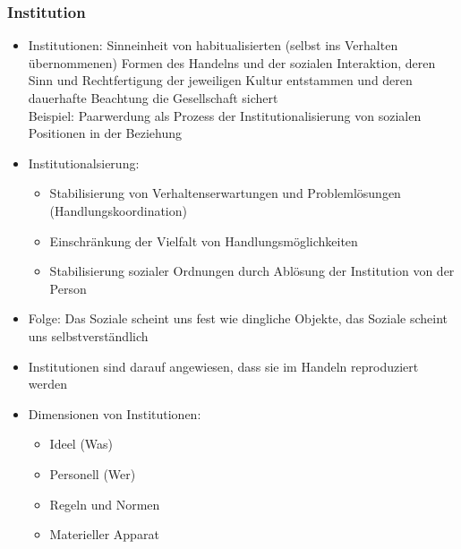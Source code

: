 \documentclass{scrartcl}
\begin{document}
\subsubsection*{Institution}
\begin{itemize}
    \item
        Institutionen: Sinneinheit von habitualisierten (selbst ins Verhalten übernommenen) Formen des Handelns und der sozialen Interaktion, deren Sinn und Rechtfertigung der jeweiligen Kultur entstammen und deren dauerhafte Beachtung die Gesellschaft sichert\\
        Beispiel: Paarwerdung als Prozess der Institutionalisierung von sozialen Positionen in der Beziehung
    \item
        Institutionalsierung:
        \begin{itemize}
            \item
                Stabilisierung von Verhaltenserwartungen und Problemlösungen (Handlungskoordination)
            \item
                Einschränkung der Vielfalt von Handlungsmöglichkeiten
            \item
                Stabilisierung sozialer Ordnungen durch Ablösung der Institution von der Person
        \end{itemize}
    \item
        Folge: Das Soziale scheint uns fest wie dingliche Objekte, das Soziale scheint uns selbstverständlich
    \item
        Institutionen sind darauf angewiesen, dass sie im Handeln reproduziert werden
    \item
        Dimensionen von Institutionen:
        \begin{itemize}
            \item
                Ideel (Was)
            \item
                Personell (Wer)
            \item
                Regeln und Normen 
            \item
                Materieller Apparat
        \end{itemize}
\end{itemize}
\end{document}
